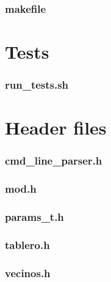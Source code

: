 \subsubsection{makefile}\label{app_makefile}

\clearpage

\section{Tests}\label{appendix_tests}

\subsubsection{run\_tests.sh}\label{app_run_tests}


\clearpage
\section{Header files}\label{appendix_headers}

\subsubsection{cmd\_line\_parser.h}\label{app_cmd_line_parser_h}

\clearpage

\subsubsection{mod.h}\label{app_mod_h}

\clearpage

\subsubsection{params\_t.h}\label{app_params_t_h}

\clearpage

\subsubsection{tablero.h}\label{app_tablero_h}

\clearpage

\subsubsection{vecinos.h}\label{app_vecinos_h}

\clearpage


